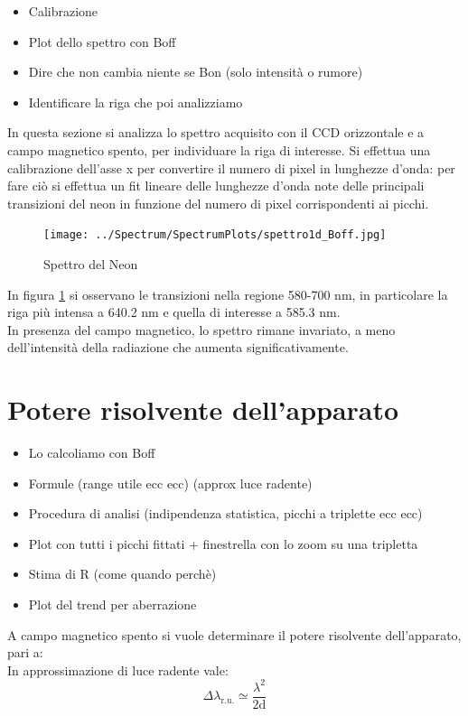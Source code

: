 \documentclass[twocolumn,10pt]{asme2ej}
\begin{document}
\begin{itemize}
    \item Calibrazione
    \item Plot dello spettro con Boff
    \item Dire che non cambia niente se Bon (solo intensità o rumore)
    \item Identificare la riga che poi analizziamo
\end{itemize}
In questa sezione si analizza lo spettro acquisito con il CCD orizzontale e a campo magnetico spento, per individuare la riga di interesse. 
Si effettua una calibrazione dell'asse x per convertire il numero di pixel in lunghezze d'onda: per fare ciò si effettua un fit lineare 
delle lunghezze d'onda note delle principali transizioni del neon in funzione del numero di pixel corrispondenti ai picchi. 
 
\begin{figure}
    \centering
    \texttt{[image: ../Spectrum/SpectrumPlots/spettro1d\_Boff.jpg]}
    \caption{Spettro del Neon}
    \label{i:spettro1d}
\end{figure}


In figura \ref{i:spettro1d} si osservano le transizioni nella regione 580-700 \si{\nano \metre}, in particolare la riga più intensa 
a 640.2 \si{\nano \metre} e quella di interesse a 585.3 \si{\nano \metre}.\\
In presenza del campo magnetico, lo spettro rimane invariato, a meno dell'intensità della radiazione che aumenta significativamente. 


\section{Potere risolvente dell'apparato}

\begin{itemize}
    \item Lo calcoliamo con Boff
    \item Formule (range utile ecc ecc) (approx luce radente) 
    \item Procedura di analisi (indipendenza statistica, picchi a triplette ecc ecc)
    \item Plot con tutti i picchi fittati + finestrella con lo zoom su una tripletta
    \item Stima di R (come quando perchè)
    \item Plot del trend per aberrazione 
\end{itemize}
A campo magnetico spento si vuole determinare il potere risolvente dell'apparato, pari a:
\begin{equation}
    
\end{equation}
In approssimazione di luce radente vale:
\begin{equation}
    \Delta \lambda_{\text{r.u.}} \simeq \frac{\lambda^2}{2\text{d}}
    \label{e:lambdaru}
\end{equation}
\end{document}
